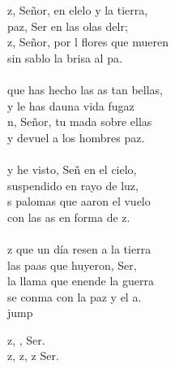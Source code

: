 \begin{cancion}%
	z, Señor, en elelo y la tierra,\\
	paz, Ser en las olas delr;\\
	z, Señor, por l flores que mueren\\
	sin sablo la brisa al pa.\\
	\jump\\
	 que has hecho las as tan bellas, \\
	y le has dauna vida fugaz\\
	n, Señor, tu mada sobre ellas\\
	y devuel a los hombres paz.\\
	\jump\\
	y he visto, Señ en el cielo, \\
	suspendido en rayo de luz,\\
	s palomas que aaron el vuelo\\
	con las as en forma de z.\\
	\jump\\
	z que un día resen a la tierra\\
	las paas que huyeron, Ser,\\
	la llama que enende la guerra\\
	se conma con la paz y el a.\\jump\\
	\begin{chorus}%
	z, ,  Ser.\\
	z, z, z Ser.\\
	\end{chorus}%
	\jump\\
\end{cancion}%

